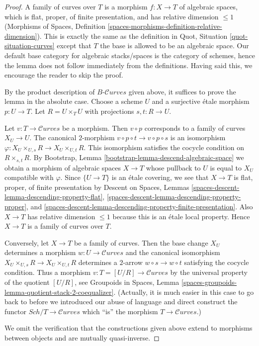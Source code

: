 \documentclass{stacks-project}
\theoremstyle{plain}
\theoremstyle{definition}
\theoremstyle{remark}
\numberwithin{equation}{subsection}
\def\Sch{\mathit{Sch}}
\def\Curvesstack{\mathcal{C}\!\mathit{urves}}
\begin{document}
\begin{proof}
A family of curves over $T$ is a morphism $f : X \to T$ of algebraic
spaces, which is flat, proper, of finite presentation, and has
relative dimension $\leq 1$ (Morphisms of Spaces, Definition
\ref{spaces-morphisms-definition-relative-dimension}).
This is exactly the same as the definition in
Quot, Situation \ref{quot-situation-curves}
except that $T$ the base is allowed to be an algebraic space.
Our default base category for algebraic stacks/spaces
is the category of schemes, hence the lemma does not follow
immediately from the definitions. Having said this, we encourage
the reader to skip the proof.

\medskip\noindent
By the product description of $B\text{-}\Curvesstack$ given above,
it suffices to prove the lemma in the absolute case. Choose a scheme
$U$ and a surjective \'etale morphism $p : U \to T$.
Let $R = U \times_T U$ with projections $s, t : R \to U$.

\medskip\noindent
Let $v : T \to \Curvesstack$ be a morphism. Then $v \circ p$
corresponds to a family of curves $X_U \to U$. The canonical
$2$-morphism $v \circ p \circ t \to v \circ p \circ s$
is an isomorphism $\varphi : X_U \times_{U, s} R \to X_U \times_{U, t} R$.
This isomorphism satisfies the cocycle condition on
$R \times_{s, t} R$.
By Bootstrap, Lemma \ref{bootstrap-lemma-descend-algebraic-space}
we obtain a morphism of algebraic spaces $X \to T$
whose pullback to $U$ is equal to $X_U$ compatible with $\varphi$.
Since $\{U \to T\}$ is an \'etale covering, we see that
$X \to T$ is flat, proper, of finite presentation by
Descent on Spaces, Lemmas
\ref{spaces-descent-lemma-descending-property-flat},
\ref{spaces-descent-lemma-descending-property-proper}, and
\ref{spaces-descent-lemma-descending-property-finite-presentation}.
Also $X \to T$ has relative dimension $\leq 1$ because this is
an \'etale local property. Hence $X \to T$ is a family of curves over $T$.

\medskip\noindent
Conversely, let $X \to T$ be a family of curves. Then the
base change $X_U$ determines a morphism $w : U \to \Curvesstack$
and the canonical isomorphism $X_U \times_{U, s} R \to X_U \times_{U, t} R$
determines a $2$-arrow $w \circ s \to w \circ t$ satisfying the
cocycle condition. Thus a morphism $v : T = [U/R] \to \Curvesstack$
by the universal property of the quotient $[U/R]$, see
Groupoids in Spaces, Lemma
\ref{spaces-groupoids-lemma-quotient-stack-2-coequalizer}.
(Actually, it is much easier in this case to go back to before
we introduced our abuse of language and direct construct
the functor $\Sch/T \to \Curvesstack$ which ``is'' the
morphism $T \to \Curvesstack$.)

\medskip\noindent
We omit the verification that the constructions given above
extend to morphisms between objects and are mutually quasi-inverse.
\end{proof}
\end{document}
